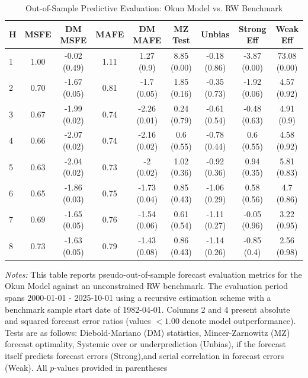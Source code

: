 \begin{table}[htbp]
\centering
\caption{Out-of-Sample Predictive Evaluation: Okun Model vs. RW Benchmark}
\label{tab:okun_model_evaluation}
\footnotesize
\begin{tabular}{l cccccccc}
\hline\hline
\rule{0pt}{3ex}
\textbf{H} & \textbf{MSFE} & \textbf{DM MSFE} & \textbf{MAFE} & \textbf{DM MAFE} & \textbf{MZ Test} & \textbf{Unbias} & \textbf{Strong Eff} & \textbf{Weak Eff} \\[0.5ex]
\hline
\rule{0pt}{2.5ex}
1 & 1.00 & -0.02 (0.49) & 1.11 & 1.27 (0.9) & 8.85 (0.00) & -0.18 (0.86) & -3.87 (0.00) & 73.08 (0.00) \\
2 & 0.70 & -1.67 (0.05) & 0.81 & -1.7 (0.05) & 1.85 (0.16) & -0.35 (0.73) & -1.92 (0.06) & 4.57 (0.92) \\
3 & 0.67 & -1.99 (0.02) & 0.74 & -2.26 (0.01) & 0.24 (0.79) & -0.61 (0.54) & -0.48 (0.63) & 4.91 (0.9) \\
4 & 0.66 & -2.07 (0.02) & 0.74 & -2.16 (0.02) & 0.6 (0.55) & -0.78 (0.44) & 0.6 (0.55) & 4.58 (0.92) \\
5 & 0.63 & -2.04 (0.02) & 0.73 & -2 (0.02) & 1.02 (0.36) & -0.92 (0.36) & 0.94 (0.35) & 5.81 (0.83) \\
6 & 0.65 & -1.86 (0.03) & 0.75 & -1.73 (0.04) & 0.85 (0.43) & -1.06 (0.29) & 0.58 (0.56) & 4.7 (0.86) \\
7 & 0.69 & -1.65 (0.05) & 0.76 & -1.54 (0.06) & 0.61 (0.54) & -1.11 (0.27) & -0.05 (0.96) & 3.22 (0.95) \\
8 & 0.73 & -1.63 (0.05) & 0.79 & -1.43 (0.08) & 0.86 (0.43) & -1.14 (0.26) & -0.85 (0.4) & 2.56 (0.98) \\
\hline\hline
\end{tabular}%
\par\smallskip
\parbox{\textwidth}{\scriptsize \textit{Notes:} This table reports pseudo-out-of-sample forecast evaluation metrics for the Okun Model against an unconstrained RW benchmark. The evaluation period spans 2000-01-01 - 2025-10-01 using a recursive estimation scheme with a benchmark sample start date of 1982-04-01. Columns 2 and 4 present absolute and squared forecast error ratios (values $< 1.00$ denote model outperformance). Tests are as follows: Diebold-Mariano (DM) statistics, Mincer-Zarnowitz (MZ) forecast optimality, Systemic over or underprediction (Unbias), if the forecast itself predicts forecast errors (Strong),and serial correlation in forecast errors (Weak). All $p$-values provided in parentheses}
\end{table}
